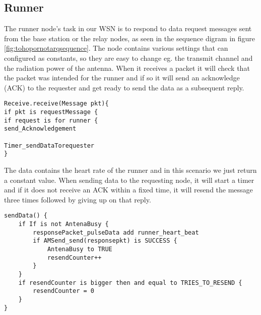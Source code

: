 \subsection{Runner}\label{sc:runner}

The runner node's task in our WSN is to respond to data request messages sent from the base station or the relay nodes, as seen in the sequence digram in figure \ref{fig:tohopornotarqsequence}. The node contains various settings that can configured as constants, so they are easy to change eg. the transmit channel and the radiation power of the antenna. When it receives a packet it will check that the packet was intended for the runner and if so it will send an acknowledge (ACK) to the requester and get ready to send the data as a subsequent reply.

\begin{minipage}[t]{0.95\linewidth}
\begin{lstlisting}[label={lst:runner1}, caption={Runner receives requests and responds.}]
Receive.receive(Message pkt){
if pkt is requestMessage {
if request is for runner {
send_Acknowledgement

Timer_sendDataTorequester 
}
\end{lstlisting}
\end{minipage}

The data contains the heart rate of the runner and in this scenario we just return a constant value. When sending data to the requesting node, it will start a timer and if it does not receive an ACK within a fixed time, it will resend the message three times followed by giving up on that reply.

\begin{minipage}[t]{0.95\linewidth}
\begin{lstlisting}[label={lst:runner2}, caption={Runner sends data packet with runner's heart rate.}]
sendData() {
	if If is not AntenaBusy {
		responsePacket_pulseData add runner_heart_beat
		if AMSend_send(responsepkt) is SUCCESS {
			AntenaBusy to TRUE
			resendCounter++
		}
	}
	if resendCounter is bigger then and equal to TRIES_TO_RESEND {
		resendCounter = 0
	}
}
\end{lstlisting}
\end{minipage}